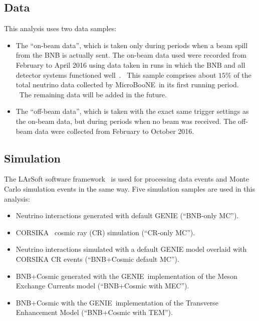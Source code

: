 \documentclass{article}
\begin{document}
\subsection{Data}
This analysis uses two data samples:
\begin{itemize}
\item The  \textquotedblleft on-beam data\textquotedblright, which
is taken only during periods when a beam spill from the BNB is actually
sent. The on-beam data used were recorded from February
to April  2016 using data taken in runs in which the BNB and all detector systems
functioned well~\cite{DocDB5986-Run1DQ-PUB}. \ This sample comprises about $%
15\%$ of the total neutrino data collected by MicroBooNE\ in its first
running period. \ The remaining data will be added in the future.
\item The \textquotedblleft off-beam data\textquotedblright, which is taken
with the exact same trigger settings as the on-beam data, but during periods
when no beam was received. The off-beam data were collected from February to October 2016. 
\end{itemize}

\subsection{Simulation}

The LArSoft software framework~\cite{Larsoft reference} is used for
processing data events and Monte Carlo simulation events in the same way.
Five simulation samples are used in this analysis: 
\begin{itemize}
\item Neutrino interactions generated with default GENIE (\textquotedblleft BNB-only MC\textquotedblright ).
\item CORSIKA~\cite%
{Corsika} cosmic ray (CR) simulation (\textquotedblleft CR-only MC\textquotedblright ).
\item Neutrino interactions simulated with a default GENIE model overlaid with CORSIKA CR events (\textquotedblleft BNB+Cosmic default MC\textquotedblright ). 
\item BNB+Cosmic generated with the GENIE\ implementation of the Meson
Exchange Currents model (\textquotedblleft BNB+Cosmic with
MEC\textquotedblright ).
\item BNB+Cosmic with the GENIE\ implementation of
the Transverse Enhancement Model (\textquotedblleft BNB+Cosmic with
TEM\textquotedblright ).
\end{itemize}
\end{document}

